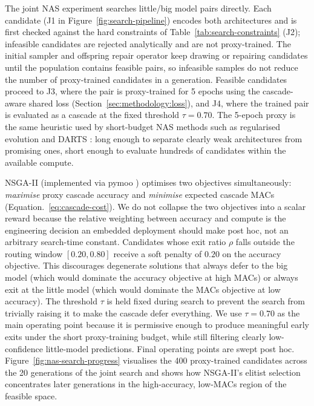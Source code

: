 \documentclass[conference]{IEEEtran}
\begin{document}
The joint NAS experiment searches little/big model pairs directly. Each
candidate (J1 in Figure~\ref{fig:search-pipeline}) encodes both
architectures and is first checked against the hard constraints of
Table~\ref{tab:search-constraints} (J2); infeasible candidates are
rejected analytically and are not proxy-trained. The initial sampler and
offspring repair operator keep drawing or repairing candidates until the
population contains feasible pairs, so infeasible samples do not reduce the
number of proxy-trained candidates in a generation. Feasible candidates
proceed to J3, where the pair is proxy-trained for 5 epochs using the
cascade-aware shared loss (Section~\ref{sec:methodology:loss}), and J4,
where the trained pair is evaluated as a cascade at the fixed threshold
$\tau=0.70$. The 5-epoch proxy is the same heuristic used by
short-budget NAS methods such as regularised evolution
\cite{real2019regevo} and DARTS \cite{liu2019darts}: long enough to separate
clearly weak architectures from promising ones, short enough to evaluate
hundreds of candidates within the available compute.

NSGA-II \cite{deb2002nsga2} (implemented via pymoo \cite{blank2020pymoo}) optimises two objectives simultaneously:
\emph{maximise} proxy cascade accuracy and \emph{minimise} expected cascade
MACs (Equation.~\ref{eq:cascade-cost}). We do not collapse the two objectives into
a scalar reward because the relative weighting between accuracy and compute
is the engineering decision an embedded deployment should make
post hoc, not an arbitrary search-time constant. Candidates whose exit ratio
$\rho$ falls outside the routing window $[0.20, 0.80]$ receive a soft
penalty of $0.20$ on the accuracy objective. This discourages degenerate
solutions that always defer to the big model (which would dominate the
accuracy objective at high MACs) or always exit at the little model (which
would dominate the MACs objective at low accuracy). The threshold $\tau$ is
held fixed during search to prevent the search from trivially raising it to
make the cascade defer everything. We use $\tau=0.70$ as the main operating
point because it is permissive enough to produce meaningful early exits under
the short proxy-training budget, while still filtering clearly low-confidence
little-model predictions. Final operating points are swept post
hoc. Figure~\ref{fig:nas-search-progress} visualises the 400 proxy-trained
candidates across the 20 generations of the joint search and shows how
NSGA-II's elitist selection concentrates later generations in the
high-accuracy, low-MACs region of the feasible space.
\end{document}
